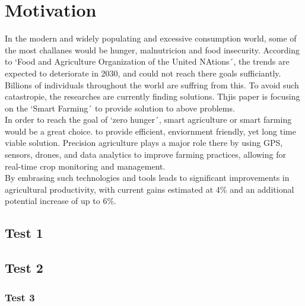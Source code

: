 \chapter{Motivation}
In the modern and widely populating and excessive consumption world, some of the most challanes would be hunger, malnutricion and food insecurity. According to `Food and Agriculture Organization of the United NAtions´, the trends are expected to deteriorate in 2030, and could not reach there goals sufficiantly. Billions of individuals throughout the world are suffring from this\cite{FAO2024SOFI}. To avoid such catastropie, the researches are currently finding solutions. Thjis paper is focusing on the `Smart Farming´ to provide solution to above problems.\\ In order to reach the goal of `zero hunger´, smart agriculture or smart farming would be a great choice. to provide efficient, enviornment friendly, yet long time viable solution. Precision agriculture plays a major role there by using GPS, sensors, drones, and data analytics to improve farming practices, allowing for real-time crop monitoring and management\cite{Hiywotu2025SustainableAg}. \\ 

By embrasing such technologies and tools leads to significant improvements in agricultural productivity, with current gains estimated at 4\% and an additional potential increase of up to 6\%\cite{Hiywotu2025SustainableAg}.
\section{Test 1}
\section{Test 2}
\subsection{Test 3}